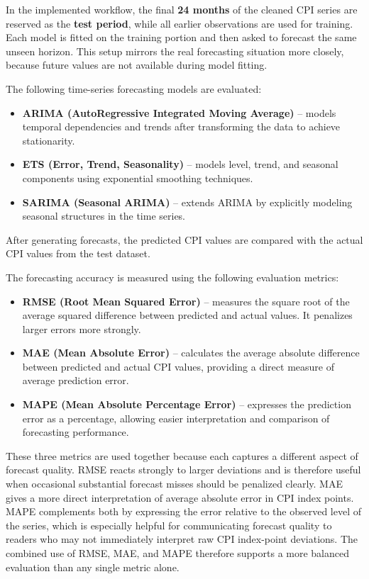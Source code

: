 In the implemented workflow, the final \textbf{24 months} of the cleaned CPI series are reserved as the \textbf{test period}, while all earlier observations are used for training. Each model is fitted on the training portion and then asked to forecast the same unseen horizon. This setup mirrors the real forecasting situation more closely, because future values are not available during model fitting.

The following time-series forecasting models are evaluated:

\begin{itemize}
	\item \textbf{ARIMA (AutoRegressive Integrated Moving Average)} -- models temporal dependencies and trends after transforming the data to achieve stationarity.
	\item \textbf{ETS (Error, Trend, Seasonality)} -- models level, trend, and seasonal components using exponential smoothing techniques.
	\item \textbf{SARIMA (Seasonal ARIMA)} -- extends ARIMA by explicitly modeling seasonal structures in the time series.
\end{itemize}

After generating forecasts, the predicted CPI values are compared with the actual CPI values from the test dataset.

The forecasting accuracy is measured using the following evaluation metrics:

\begin{itemize}
	\item \textbf{RMSE (Root Mean Squared Error)} -- measures the square root of the average squared difference between predicted and actual values. It penalizes larger errors more strongly.
	\item \textbf{MAE (Mean Absolute Error)} -- calculates the average absolute difference between predicted and actual CPI values, providing a direct measure of average prediction error.
	\item \textbf{MAPE (Mean Absolute Percentage Error)} -- expresses the prediction error as a percentage, allowing easier interpretation and comparison of forecasting performance.
\end{itemize}

These three metrics are used together because each captures a different aspect of forecast quality. RMSE reacts strongly to larger deviations and is therefore useful when occasional substantial forecast misses should be penalized clearly. MAE gives a more direct interpretation of average absolute error in CPI index points. MAPE complements both by expressing the error relative to the observed level of the series, which is especially helpful for communicating forecast quality to readers who may not immediately interpret raw CPI index-point deviations. The combined use of RMSE, MAE, and MAPE therefore supports a more balanced evaluation than any single metric alone.

